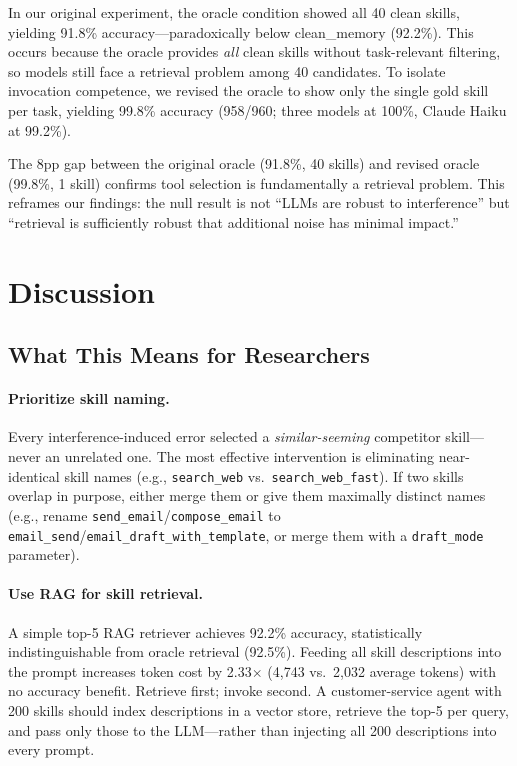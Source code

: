 \documentclass[11pt]{article}
\begin{document}
In our original experiment, the oracle condition showed all 40 clean skills, yielding 91.8\% accuracy---paradoxically below clean\_memory (92.2\%). This occurs because the oracle provides \emph{all} clean skills without task-relevant filtering, so models still face a retrieval problem among 40 candidates. To isolate invocation competence, we revised the oracle to show only the single gold skill per task, yielding 99.8\% accuracy (958/960; three models at 100\%, Claude Haiku at 99.2\%).

The 8pp gap between the original oracle (91.8\%, 40 skills) and revised oracle (99.8\%, 1 skill) confirms tool selection is fundamentally a retrieval problem. This reframes our findings: the null result is not ``LLMs are robust to interference'' but ``retrieval is sufficiently robust that additional noise has minimal impact.''


\section{Discussion}

\subsection{What This Means for Researchers}

\paragraph{Prioritize skill naming.}
Every interference-induced error selected a \emph{similar-seeming} competitor skill---never an unrelated one. The most effective intervention is eliminating near-identical skill names (e.g., \texttt{search\_web} vs.\ \texttt{search\_web\_fast}). If two skills overlap in purpose, either merge them or give them maximally distinct names (e.g., rename \texttt{send\_email}/\texttt{compose\_email} to \texttt{email\_send}/\texttt{email\_draft\_with\_template}, or merge them with a \texttt{draft\_mode} parameter).

\paragraph{Use RAG for skill retrieval.}
A simple top-5 RAG retriever achieves 92.2\% accuracy, statistically indistinguishable from oracle retrieval (92.5\%). Feeding all skill descriptions into the prompt increases token cost by 2.33$\times$ (4,743 vs.\ 2,032 average tokens) with no accuracy benefit. Retrieve first; invoke second. A customer-service agent with 200 skills should index descriptions in a vector store, retrieve the top-5 per query, and pass only those to the LLM---rather than injecting all 200 descriptions into every prompt.
\end{document}

